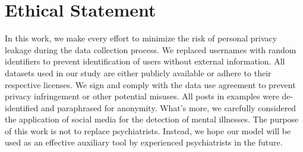\section{Ethical Statement}
In this work, we make every effort to minimize the risk of personal privacy leakage during the data collection process. We replaced usernames with random identifiers to prevent identification of users without external information. All datasets used in our study are either publicly available or adhere to their respective licenses. We sign and comply with the data use agreement to prevent privacy infringement or other potential misuses. All posts in examples were de-identified and paraphrased for anonymity.
What's more, we carefully considered the application of social media for the detection of mental illnesses. The purpose of this work is not to replace psychiatrists. Instead, we hope our model will be used as an effective auxiliary tool by experienced psychiatrists in the future.